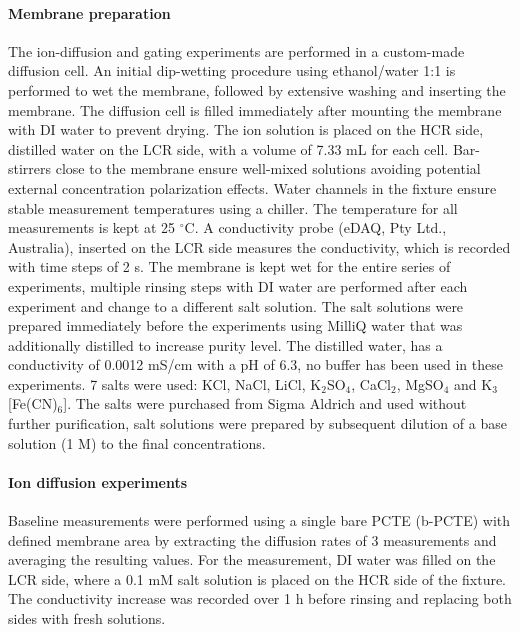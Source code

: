 \paragraph{Membrane preparation} The ion-diffusion and gating experiments are
performed in a custom-made diffusion cell. An initial dip-wetting
procedure using ethanol/water 1:1 is performed to wet the membrane,
followed by extensive washing and inserting the membrane. The
diffusion cell is filled immediately after mounting the membrane with
DI water to prevent drying. The ion solution is placed on the HCR
side, distilled water on the LCR side, with a volume of 7.33 mL for
each cell. Bar-stirrers close to the membrane ensure well-mixed
solutions avoiding potential external concentration polarization
effects. Water channels in the fixture ensure stable measurement
temperatures using a chiller. The temperature for all measurements is
kept at 25 $^{\circ}$C. A conductivity probe (eDAQ, Pty Ltd.,
Australia), inserted on the LCR side measures the conductivity, which
is recorded with time steps of 2 s. The membrane is kept wet for the
entire series of experiments, multiple rinsing steps with DI water are
performed after each experiment and change to a different salt
solution. The salt solutions were prepared immediately before the
experiments using MilliQ water that was additionally distilled to
increase purity level. The distilled water, has a conductivity of
0.0012 mS/cm with a pH of 6.3, no buffer has been used in these
experiments. 7 salts were used: KCl, NaCl, LiCl, K$_{2}$SO$_{4}$,
CaCl$_{2}$, MgSO$_{4}$ and K$_{3}$[Fe(CN)$_{6}$]. The salts were
purchased from Sigma Aldrich and used without further purification,
salt solutions were prepared by subsequent dilution of a base solution
(1 M) to the final concentrations.

\vspace{1em}
\noindent
\paragraph{Ion diffusion experiments} { Baseline measurements were
performed using a single bare PCTE (b-PCTE) with defined membrane area} by extracting the diffusion rates
of 3 measurements and averaging the resulting values. For the measurement, DI water was filled on
the LCR side, where a 0.1 mM salt solution is placed on the HCR side
of the fixture. The conductivity increase was recorded over 1 h before
rinsing and replacing both sides with fresh solutions.

\vspace{1em}
\noindent
